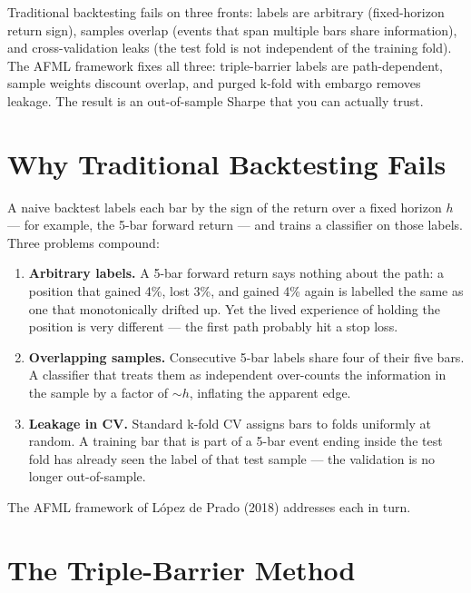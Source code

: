 \begin{keyinsight}
Traditional backtesting fails on three fronts: labels are arbitrary
(fixed-horizon return sign), samples overlap (events that span
multiple bars share information), and cross-validation leaks (the
test fold is not independent of the training fold). The AFML framework
fixes all three: triple-barrier labels are path-dependent, sample
weights discount overlap, and purged k-fold with embargo removes
leakage. The result is an out-of-sample Sharpe that you can actually
trust.
\end{keyinsight}

\section{Why Traditional Backtesting Fails}

A naive backtest labels each bar by the sign of the return over a
fixed horizon $h$ --- for example, the 5-bar forward return --- and
trains a classifier on those labels. Three problems compound:

\begin{enumerate}
    \item \textbf{Arbitrary labels.} A 5-bar forward return says
      nothing about the path: a position that gained 4\%, lost 3\%,
      and gained 4\% again is labelled the same as one that monotonically
      drifted up. Yet the lived experience of holding the position
      is very different --- the first path probably hit a stop loss.
    \item \textbf{Overlapping samples.} Consecutive 5-bar labels share
      four of their five bars. A classifier that treats them as
      independent over-counts the information in the sample by a factor
      of $\sim h$, inflating the apparent edge.
    \item \textbf{Leakage in CV.} Standard k-fold CV assigns bars to
      folds uniformly at random. A training bar that is part of a
      5-bar event ending inside the test fold has already seen the
      label of that test sample --- the validation is no longer
      out-of-sample.
\end{enumerate}

The AFML framework of López de Prado (2018) addresses each in turn.

\section{The Triple-Barrier Method}

